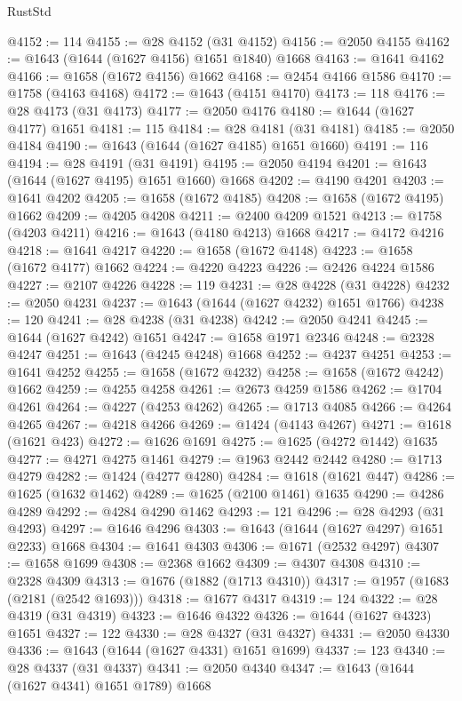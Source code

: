 \begin{lexlean}{RustStd}
\begin{coremodule}
@4152 := 114
@4155 := @28 @4152 (@31 @4152)
@4156 := @2050 @4155
@4162 := @1643 (@1644 (@1627 @4156) @1651 @1840) @1668
@4163 := @1641 @4162
@4166 := @1658 (@1672 @4156) @1662
@4168 := @2454 @4166 @1586
@4170 := @1758 (@4163 @4168)
@4172 := @1643 (@4151 @4170)
@4173 := 118
@4176 := @28 @4173 (@31 @4173)
@4177 := @2050 @4176
@4180 := @1644 (@1627 @4177) @1651
@4181 := 115
@4184 := @28 @4181 (@31 @4181)
@4185 := @2050 @4184
@4190 := @1643 (@1644 (@1627 @4185) @1651 @1660)
@4191 := 116
@4194 := @28 @4191 (@31 @4191)
@4195 := @2050 @4194
@4201 := @1643 (@1644 (@1627 @4195) @1651 @1660) @1668
@4202 := @4190 @4201
@4203 := @1641 @4202
@4205 := @1658 (@1672 @4185)
@4208 := @1658 (@1672 @4195) @1662
@4209 := @4205 @4208
@4211 := @2400 @4209 @1521
@4213 := @1758 (@4203 @4211)
@4216 := @1643 (@4180 @4213) @1668
@4217 := @4172 @4216
@4218 := @1641 @4217
@4220 := @1658 (@1672 @4148)
@4223 := @1658 (@1672 @4177) @1662
@4224 := @4220 @4223
@4226 := @2426 @4224 @1586
@4227 := @2107 @4226
@4228 := 119
@4231 := @28 @4228 (@31 @4228)
@4232 := @2050 @4231
@4237 := @1643 (@1644 (@1627 @4232) @1651 @1766)
@4238 := 120
@4241 := @28 @4238 (@31 @4238)
@4242 := @2050 @4241
@4245 := @1644 (@1627 @4242) @1651
@4247 := @1658 @1971 @2346
@4248 := @2328 @4247
@4251 := @1643 (@4245 @4248) @1668
@4252 := @4237 @4251
@4253 := @1641 @4252
@4255 := @1658 (@1672 @4232)
@4258 := @1658 (@1672 @4242) @1662
@4259 := @4255 @4258
@4261 := @2673 @4259 @1586
@4262 := @1704 @4261
@4264 := @4227 (@4253 @4262)
@4265 := @1713 @4085
@4266 := @4264 @4265
@4267 := @4218 @4266
@4269 := @1424 (@4143 @4267)
@4271 := @1618 (@1621 @423)
@4272 := @1626 @1691
@4275 := @1625 (@4272 @1442) @1635
@4277 := @4271 @4275 @1461
@4279 := @1963 @2442 @2442
@4280 := @1713 @4279
@4282 := @1424 (@4277 @4280)
@4284 := @1618 (@1621 @447)
@4286 := @1625 (@1632 @1462)
@4289 := @1625 (@2100 @1461) @1635
@4290 := @4286 @4289
@4292 := @4284 @4290 @1462
@4293 := 121
@4296 := @28 @4293 (@31 @4293)
@4297 := @1646 @4296
@4303 := @1643 (@1644 (@1627 @4297) @1651 @2233) @1668
@4304 := @1641 @4303
@4306 := @1671 (@2532 @4297)
@4307 := @1658 @1699
@4308 := @2368 @1662
@4309 := @4307 @4308
@4310 := @2328 @4309
@4313 := @1676 (@1882 (@1713 @4310))
@4317 := @1957 (@1683 (@2181 (@2542 @1693)))
@4318 := @1677 @4317
@4319 := 124
@4322 := @28 @4319 (@31 @4319)
@4323 := @1646 @4322
@4326 := @1644 (@1627 @4323) @1651
@4327 := 122
@4330 := @28 @4327 (@31 @4327)
@4331 := @2050 @4330
@4336 := @1643 (@1644 (@1627 @4331) @1651 @1699)
@4337 := 123
@4340 := @28 @4337 (@31 @4337)
@4341 := @2050 @4340
@4347 := @1643 (@1644 (@1627 @4341) @1651 @1789) @1668

\end{coremodule}
\end{lexlean}
